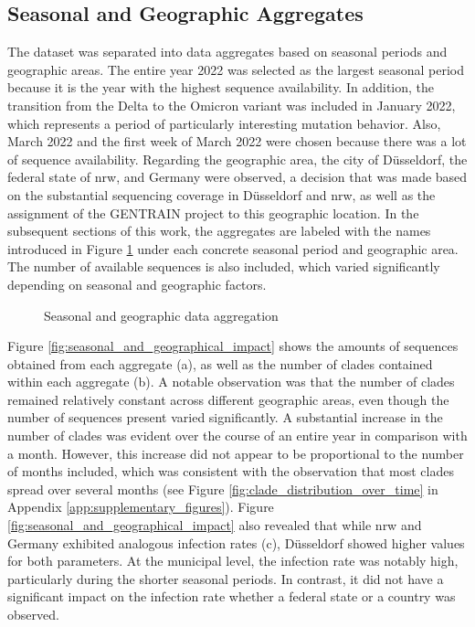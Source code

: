 \subsection{Seasonal and Geographic Aggregates}
\label{sec:representative_data_aggregates}
The dataset was separated into data aggregates based on seasonal periods and geographic areas. The entire year 2022 was selected as the largest seasonal period because it is the year with the highest sequence availability. In addition, the transition from the Delta to the Omicron variant was included in January 2022, which represents a period of particularly interesting mutation behavior. Also, March 2022 and the first week of March 2022 were chosen because there was a lot of sequence availability.
Regarding the geographic area, the city of Düsseldorf, the federal state of \acrfull{nrw}, and Germany were observed, a decision that was made based on the substantial sequencing coverage in Düsseldorf and \acrshort{nrw}, as well as the assignment of the GENTRAIN project to this geographic location. In the subsequent sections of this work, the aggregates are labeled with the names introduced in Figure \ref{fig:data_aggregates} under each concrete seasonal period and geographic area. The number of available sequences is also included, which varied significantly depending on seasonal and geographic factors. 

\begin{figure}[ht!]

    \centering
    \caption{Seasonal and geographic data aggregation}
\label{fig:data_aggregates}
\end{figure}

Figure \ref{fig:seasonal_and_geographical_impact} shows the amounts of sequences obtained from each aggregate (a), as well as the number of clades contained within each aggregate (b). A notable observation was that the number of clades remained relatively constant across different geographic areas, even though the number of sequences present varied significantly. A substantial increase in the number of clades was evident over the course of an entire year in comparison with a month. However, this increase did not appear to be proportional to the number of months included, which was consistent with the observation that most clades spread over several months (see Figure \ref{fig:clade_distribution_over_time} in Appendix \ref{app:supplementary_figures}).
Figure \ref{fig:seasonal_and_geographical_impact} also revealed that while \acrshort{nrw} and Germany exhibited analogous infection rates (c), Düsseldorf showed higher values for both parameters. At the municipal level, the infection rate was notably high, particularly during the shorter seasonal periods. 
In contrast, it did not have a significant impact on the infection rate whether a federal state or a country was observed.

